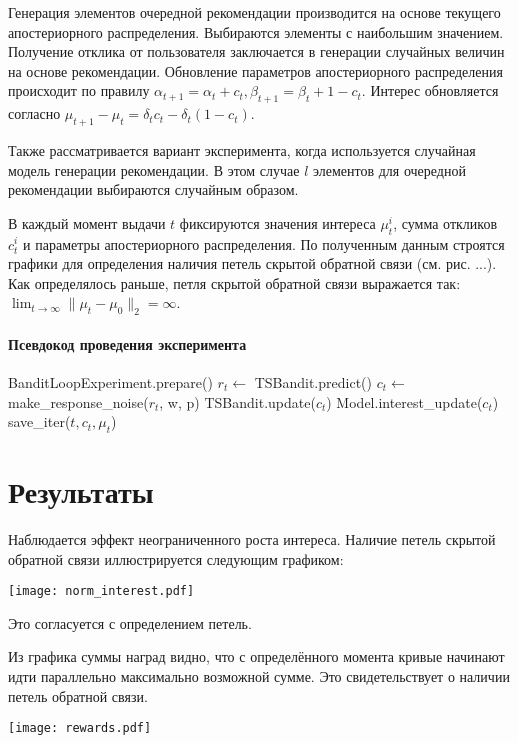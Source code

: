 \documentclass[12pt, twoside]{article}
\begin{document}
Генерация элементов очередной рекомендации производится на основе текущего апостериорного распределения. 
Выбираются элементы с наибольшим значением. 
Получение отклика от пользователя заключается в генерации случайных величин на основе рекомендации.
Обновление параметров апостериорного распределения происходит по правилу $\alpha_{t+1} = \alpha_t + c_t, \beta_{t+1} = \beta_t + 1 - c_t$. 
Интерес обновляется согласно 
$\mu_{t+1} - \mu_{t} = \delta_t c_t - \delta_t (1 - c_t)$.

Также рассматривается вариант эксперимента, когда используется случайная модель генерации рекомендации. 
В этом случае $l$ элементов для очередной рекомендации выбираются случайным образом. 

В каждый момент выдачи $t$ фиксируются значения интереса $\mu_t^i$, сумма откликов $c_t^i$ и параметры апостериорного распределения. 
По полученным данным строятся графики для определения наличия петель скрытой обратной связи (см. рис. ...).
Как определялось раньше, петля скрытой обратной связи выражается так: $\lim_{t \to \infty} \|\mu_t - \mu_0 \|_2 = \infty$.

\paragraph{Псевдокод проведения эксперимента}
\begin{algorithmic}
  \STATE BanditLoopExperiment.prepare()
    \STATE $r_t \leftarrow$ TSBandit.predict()
    \STATE $c_t \leftarrow$ make\_response\_noise($r_t$, w, p)
    \STATE TSBandit.update($c_t$)
    \STATE Model.interest\_update($c_t$)
    \STATE save\_iter($t, c_t, \mu_t$)
  \ENDFOR
\end{algorithmic}

\section{Результаты}
Наблюдается эффект неограниченного роста интереса. 
Наличие петель скрытой обратной связи иллюстрируется следующим графиком: 
\begin{center}
  \texttt{[image: norm\_interest.pdf]}
\end{center}
Это согласуется с определением петель. 

Из графика суммы наград видно, что с определённого момента кривые начинают идти параллельно максимально возможной сумме. 
Это свидетельствует о наличии петель обратной связи. 
\begin{center}
  \texttt{[image: rewards.pdf]}
\end{center}
\end{document}
